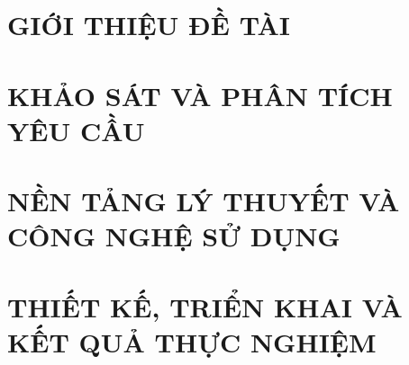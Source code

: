 \documentclass[a4paper,13pt,3p,twoside]{report}
\theoremstyle{definition}
\begin{document}
\renewcommand{\listtablename}{DANH MỤC BẢNG BIỂU}

 \renewcommand*{\glossaryname}{Danh sách thuật ngữ}
\renewcommand*{\acronymname}{DANH MỤC THUẬT NGỮ VÀ TỪ VIẾT TẮT}
\renewcommand*{\entryname}{Thuật ngữ}
\renewcommand*{\descriptionname}{Ý nghĩa}
\printnoidxglossary[type=\acronymtype] %


% 


\newpage
{}

\pagestyle{fancy}
\fancyhf{}
\fancyhead[RE, LO]{\leftmark}
\fancyfoot[RE, LO]{\thepage}

\chapter{GIỚI THIỆU ĐỀ TÀI}
\label{chapter:Introduction}

\newpage
\chapter{KHẢO SÁT VÀ PHÂN TÍCH YÊU CẦU}
\label{chapter:Related_works}



\newpage
\chapter{NỀN TẢNG LÝ THUYẾT VÀ CÔNG NGHỆ SỬ DỤNG}
\label{chapter:Methodology}


\newpage
\chapter{THIẾT KẾ, TRIỂN KHAI VÀ KẾT QUẢ THỰC NGHIỆM}
\label{chapter:Experiment}

\end{document}

